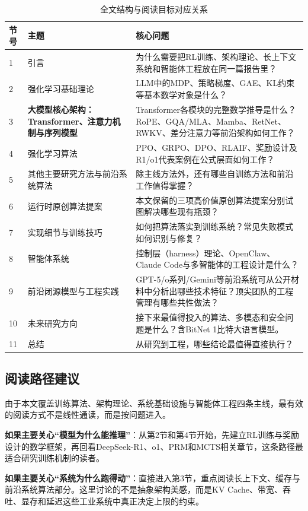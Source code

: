 \documentclass[12pt,a4paper]{article}
\begin{document}
\begin{table}[H]
\centering
\small
\caption{全文结构与阅读目标对应关系}
\begin{tabular}{p{0.9cm}p{4.0cm}p{8.0cm}}
\toprule
\textbf{节号} & \textbf{主题} & \textbf{核心问题} \\
\midrule
1 & 引言 & 为什么需要把RL训练、架构理论、长上下文系统和智能体工程放在同一篇报告里？ \\
2 & 强化学习基础理论 & LLM中的MDP、策略梯度、GAE、KL约束等基本数学对象是什么？ \\
\rowcolor[gray]{0.90}
3 & \textbf{大模型核心架构：Transformer、注意力机制与序列模型} & Transformer各模块的完整数学推导是什么？RoPE、GQA/MLA、Mamba、RetNet、RWKV、差分注意力等前沿架构如何工作？ \\
4 & 强化学习算法 & PPO、GRPO、DPO、RLAIF、奖励设计及R1/o1代表案例在公式层面如何工作？ \\
5 & 其他主要研究方法与前沿系统算法 & 除主线方法外，还有哪些自训练方法和前沿工作值得掌握？ \\
6 & 运行时原创算法提案 & 本文保留的三项高价值原创算法提案分别试图解决哪些现有瓶颈？ \\
7 & 实现细节与训练技巧 & 如何把算法落实到训练系统？常见失败模式如何识别与修复？ \\
8 & 智能体系统 & 控制层（harness）理论、OpenClaw、Claude Code与多智能体的工程设计是什么？ \\
9 & 前沿闭源模型与工程实践 & GPT-5/o系列/Gemini等前沿系统可从公开材料中分析出哪些技术特征？顶尖团队的工程管理有哪些共性做法？ \\
10 & 未来研究方向 & 接下来最值得投入的算法、多模态和安全问题是什么？含BitNet 1比特大语言模型。 \\
11 & 总结 & 从研究到工程，哪些结论最值得直接执行？ \\
\bottomrule
\end{tabular}
\end{table}

\subsection{阅读路径建议}

由于本文覆盖训练算法、架构理论、系统基础设施与智能体工程四条主线，最有效的阅读方式不是线性通读，而是按问题进入。

\textbf{如果主要关心“模型为什么能推理”}：从第2节和第4节开始，先建立RL训练与奖励设计的数学框架，再回看DeepSeek-R1、o1、PRM和MCTS相关章节，这条路径最适合研究训练机制的读者。

\textbf{如果主要关心“系统为什么跑得动”}：直接进入第3节，重点阅读长上下文、缓存与前沿系统算法部分。这里讨论的不是抽象架构美感，而是KV Cache、带宽、吞吐、显存和延迟这些工业系统中真正决定上限的约束。
\end{document}
